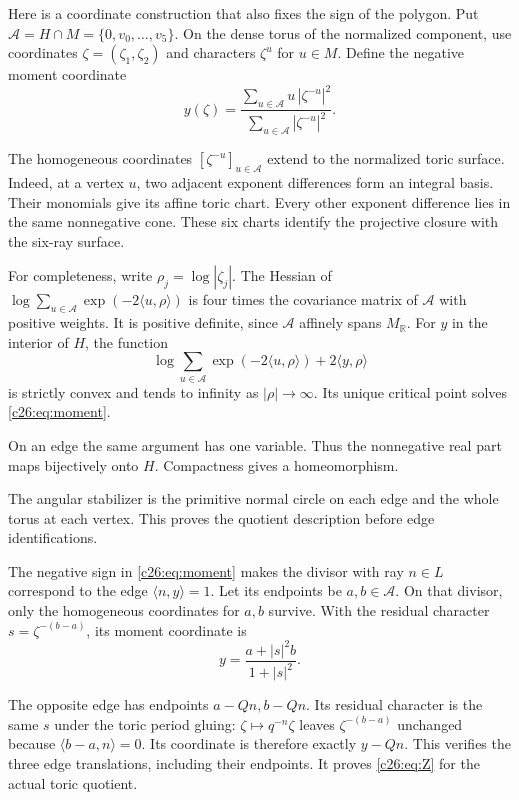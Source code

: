 Here is a coordinate construction that also fixes the sign of the polygon.
Put $\mathcal A=H\cap M=\{0,v_0,\ldots,v_5\}$.
On the dense torus of the normalized component, use coordinates
$\zeta=(\zeta_1,\zeta_2)$ and characters $\zeta^u$ for $u\in M$.
Define the negative moment coordinate
\begin{equation}\label{c26:eq:moment}
y(\zeta)=
\frac{\sum_{u\in\mathcal A}u\,|\zeta^{-u}|^2}
     {\sum_{u\in\mathcal A}|\zeta^{-u}|^2}.
\end{equation}

The homogeneous coordinates $[\zeta^{-u}]_{u\in\mathcal A}$ extend
to the normalized toric surface.
Indeed, at a vertex $u$, two adjacent exponent differences form an
integral basis. Their monomials give its affine toric chart.
Every other exponent difference lies in the same nonnegative cone.
These six charts identify the projective closure with the six-ray surface.

For completeness, write $\rho_j=\log|\zeta_j|$.
The Hessian of $\log\sum_{u\in\mathcal A}\exp(-2\langle u,\rho\rangle)$
is four times the covariance matrix of $\mathcal A$ with positive weights.
It is positive definite, since $\mathcal A$ affinely spans $M_\mathbb R$.
For $y$ in the interior of $H$, the function
\[
\log\sum_{u\in\mathcal A}\exp(-2\langle u,\rho\rangle)
       +2\langle y,\rho\rangle
\]
is strictly convex and tends to infinity as $|\rho|\to\infty$.
Its unique critical point solves \eqref{c26:eq:moment}.

On an edge the same argument has one variable.
Thus the nonnegative real part maps bijectively onto $H$.
Compactness gives a homeomorphism.

The angular stabilizer is the primitive normal circle on each edge
and the whole torus at each vertex.
This proves the quotient description before edge identifications.

The negative sign in \eqref{c26:eq:moment} makes the divisor with ray
$n\in L$ correspond to the edge $\langle n,y\rangle=1$.
Let its endpoints be $a,b\in\mathcal A$.
On that divisor, only the homogeneous coordinates for $a,b$ survive.
With the residual character $s=\zeta^{-(b-a)}$, its moment coordinate is
\[
y=\frac{a+|s|^2b}{1+|s|^2}.
\]

The opposite edge has endpoints $a-Qn,b-Qn$.
Its residual character is the same $s$ under the toric period gluing:
$\zeta\mapsto q^{-n}\zeta$ leaves $\zeta^{-(b-a)}$ unchanged because
$\langle b-a,n\rangle=0$.
Its coordinate is therefore exactly $y-Qn$.
This verifies the three edge translations, including their endpoints.
It proves \eqref{c26:eq:Z} for the actual toric quotient.

